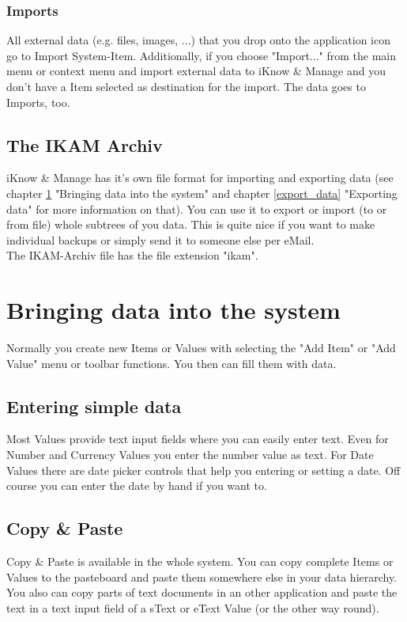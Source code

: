 \documentclass[12pt,a4]{article}
\begin{document}
\subsubsection{Imports}
\label{imports_systemitem}
\medskip
All external data (e.g. files, images, ...) that you drop onto the application icon go to Import System-Item.
Additionally, if you choose "Import..." from the main menu or context menu and import external data to iKnow \& Manage and you don't have a Item selected as destination for the import. The data goes to Imports, too.
\subsection{The IKAM Archiv}
\label{ikam_archiv}
\medskip
iKnow \& Manage has it's own file format for importing and exporting data (see chapter \ref{bring_data} "Bringing data into the system" and chapter \ref{export_data} "Exporting data" for more information on that). You can use it to export or import (to or from file) whole subtrees of you data. This is quite nice if you want to make individual backups or simply send it to someone else per eMail. \\
The IKAM-Archiv file has the file extension "ikam".
\newpage
\section{Bringing data into the system}
\label{bring_data}
\medskip
Normally you create new Items or Values with selecting the "Add Item" or "Add Value" menu or toolbar functions. You then can fill them with data.
\subsection{Entering simple data}
\label{enter_simple_import}
\medskip
Most Values provide text input fields where you can easily enter text. Even for Number and Currency Values you enter the number value as text. For Date Values there are date picker controls that help you entering or setting a date. Off course you can enter the date by hand if you want to.
\subsection{Copy \& Paste}
\label{cp_import}
\medskip
Copy \& Paste is available in the whole system. You can copy complete Items or Values to the pasteboard and paste them somewhere else in your data hierarchy. You also can copy parts of text documents in an other application and paste the text in a text input field of a sText or eText Value (or the other way round).
\end{document}
